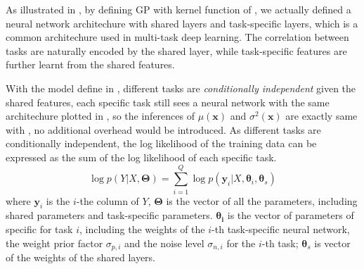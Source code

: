 As illustrated in , by defining GP with kernel function of , we actually defined a neural network architechure with shared layers and task-specific layers, which is a common architechure used in multi-task deep learning\cite{ruder2017overview}. The correlation between tasks are naturally encoded by the shared layer, while task-specific features are further learnt from the shared features. 

With the model define in , different tasks are \emph{conditionally independent} given the shared features, each specific task still sees a neural network with the same architechure plotted in , so the inferences of $\mu(\bm{x})$ and $\sigma^2(\bm{x})$ are exactly same with , no additional overhead would be introduced. As different tasks are conditionally independent, the log likelihood of the training data can be expressed as the sum of the log likelihood of each specific task.
\begin{equation}
    \log p(Y | X, \bm{\Theta}) = \sum_{i=1}^Q \log p(\bm{y}_i | X, \bm{\theta}_i, \bm{\theta}_s)
\end{equation}
where $\bm{y}_i$ is the $i$-the column of $Y$, $\bm{\Theta}$ is the vector of all the parameters, including shared parameters and task-specific parameters. $\bm{\theta_i}$ is the vector of parameters of specific for task $i$, including the weights of the $i$-th task-specific neural network, the weight prior factor $\sigma_{p, i}$ and the noise level $\sigma_{n, i}$ for the $i$-th task; $\bm{\theta}_s$ is vector of the weights of the shared layers.
